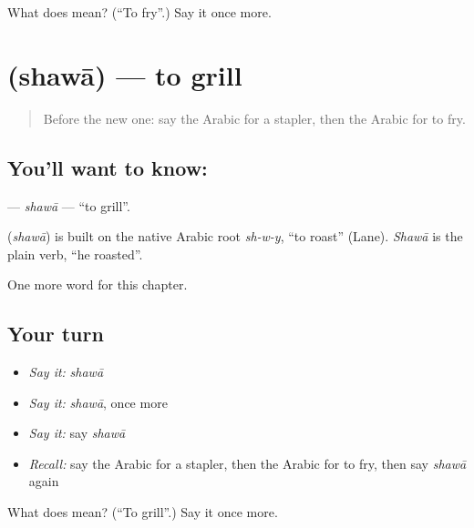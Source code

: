 \begin{tcolorbox}[breakable,colback=teal!4,colframe=teal!35!black,title={Before you move on}]
What does  mean? (\textquotedblleft{}To fry\textquotedblright{}.) Say it once more.
\end{tcolorbox}
\section[\texorpdfstring{\ar{شوى} (shawā)}{شوى (shawā)}]{ (shawā) — to grill}

\label{lesson:AR-C254-shawa}



\begin{quote}
Before the new one: say the Arabic for a stapler, then the Arabic for to fry.
\end{quote}

\subsection*{You'll want to know: }
\textbf{} — \emph{shawā} — \textquotedblleft{}to grill\textquotedblright{}.

\begin{cousinweb}
\textbf{} (\emph{shawā}) is built on the native Arabic root \emph{sh-w-y}, \textquotedblleft{}to roast\textquotedblright{} (Lane). \emph{Shawā} is the plain verb, \textquotedblleft{}he roasted\textquotedblright{}.
\end{cousinweb}

\begin{grammarlens}[title={What you've built}]
One more word for this chapter.
\end{grammarlens}

\subsection*{Your turn}
\begin{itemize}
\raggedright
  \item \emph{Say it:} \emph{shawā}
  \item \emph{Say it:} \emph{shawā}, once more
  \item \emph{Say it:} say \emph{shawā}
  \item \emph{Recall:} say the Arabic for a stapler, then the Arabic for to fry, then say \emph{shawā} again
\end{itemize}

\begin{tcolorbox}[breakable,colback=teal!4,colframe=teal!35!black,title={Before you move on}]
What does  mean? (\textquotedblleft{}To grill\textquotedblright{}.) Say it once more.
\end{tcolorbox}
